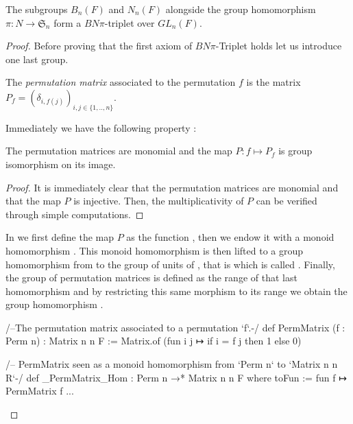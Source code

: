\begin{theoreme} \label{thm:GL}
    The subgroups $B_n\left( F \right)$ and $N_n\left( F \right)$ alongside the group homomorphism $\pi : N \to \mathfrak{S}_n$ form a $BN\pi$-triplet over $GL_n\left( F \right)$.
\end{theoreme}
\begin{proof}

Before proving that the first axiom of $BN\pi$-Triplet holds let us introduce one last group.
\begin{definition}
    The \emph{permutation matrix} associated to the permutation $f$ is the matrix $P_f = \left( \delta_{i,f(j)} \right)_{i,j \in  \{1,..,n\}}$.
\end{definition}

Immediately we have the following property : 

\begin{propriete} \label{prop:permmat}
    The permutation matrices are monomial and the map $P : f \mapsto P_f$ is group isomorphism on its image.
\end{propriete}

\begin{proof}
    It is immediately clear that the permutation matrices are monomial and that the map $P$ is injective. Then, the multiplicativity of $P$ can be verified through simple computations.
\end{proof}

In \Lean we first define the map $P$ as the function , then we endow it with a monoid homomorphism . This monoid homomorphism is then lifted to a group homomorphism from  to the group of units of , that is  which is called . Finally,  the group of permutation matrices is defined as the range of that last homomorphism and by restricting this same morphism to its range we obtain the group homomorphism .
\begin{leancode}
/--The permutation matrix associated to a permutation `f`.-/
def PermMatrix (f : Perm n) : Matrix n n F := 
    Matrix.of (fun i j ↦ if i = f j then 1 else 0)

 /-- PermMatrix seen as a monoid homomorphism from `Perm n` to `Matrix n n R`-/
def _PermMatrix_Hom : Perm n →* Matrix n n F where
  toFun := fun f ↦ PermMatrix f
  ...


\end{leancode}
\end{proof}
